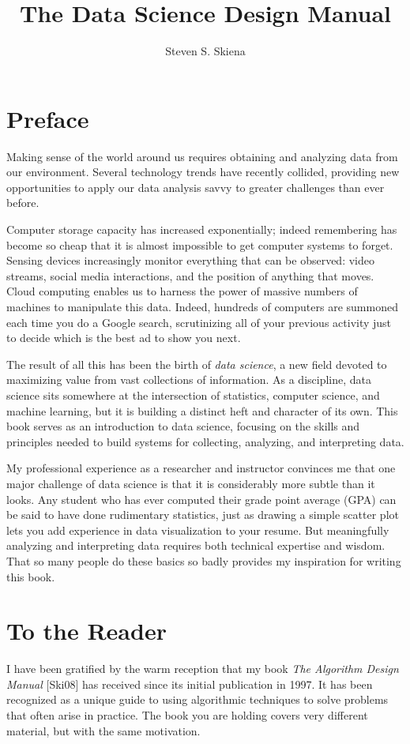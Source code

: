 \documentclass[10pt]{article}
\title{The Data Science Design Manual}
\author{Steven S. Skiena}
\date{}
\begin{document}
\maketitle
\section*{Preface}
Making sense of the world around us requires obtaining and analyzing data from our environment. Several technology trends have recently collided, providing new opportunities to apply our data analysis savvy to greater challenges than ever before.

Computer storage capacity has increased exponentially; indeed remembering has become so cheap that it is almost impossible to get computer systems to forget. Sensing devices increasingly monitor everything that can be observed: video streams, social media interactions, and the position of anything that moves. Cloud computing enables us to harness the power of massive numbers of machines to manipulate this data. Indeed, hundreds of computers are summoned each time you do a Google search, scrutinizing all of your previous activity just to decide which is the best ad to show you next.

The result of all this has been the birth of \textit{data science}, a new field devoted to maximizing value from vast collections of information. As a discipline, data science sits somewhere at the intersection of statistics, computer science, and machine learning, but it is building a distinct heft and character of its own. This book serves as an introduction to data science, focusing on the skills and principles needed to build systems for collecting, analyzing, and interpreting data.

My professional experience as a researcher and instructor convinces me that one major challenge of data science is that it is considerably more subtle than it looks. Any student who has ever computed their grade point average (GPA) can be said to have done rudimentary statistics, just as drawing a simple scatter plot lets you add experience in data visualization to your resume. But meaningfully analyzing and interpreting data requires both technical expertise and wisdom. That so many people do these basics so badly provides my inspiration for writing this book.

\section*{To the Reader}
I have been gratified by the warm reception that my book \textit{The Algorithm Design Manual} [Ski08] has received since its initial publication in 1997. It has been recognized as a unique guide to using algorithmic techniques to solve problems that often arise in practice. The book you are holding covers very different material, but with the same motivation.
\end{document}
